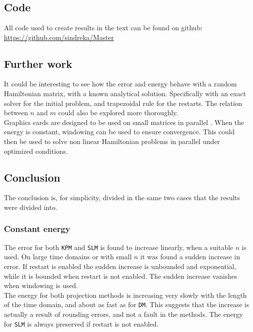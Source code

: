 \chapter{  }
\section{Code}
All code used to create results in the text can be found on github: \\
\url{https://github.com/sindreka/Master}
\section{Further work}
It could be interesting to see how the error and energy behave with a random Hamiltonian matrix, with a known analytical solution. Specifically with an exact solver for the initial problem, and trapezoidal rule for the restarts. The relation between $n$ and $m$ could also be explored more thoroughly. \\

\noindent Graphics cards are designed to be used on small matrices in parallel \cite{graphics}. When the energy is constant, windowing can be used to ensure convergence. This could then be used to solve non linear Hamiltonian problems in parallel under optimized conditions. \\

\section{Conclusion}
The conclusion is, for simplicity, divided in the same two cases that the results were divided into.
\subsection{Constant energy} %
The error for both \texttt{KPM} and \texttt{SLM} is found to increase linearly, when a suitable $n$ is used. On large time domains or with small $n$ it was found a sudden increase in error. If restart is enabled the sudden increase is unbounded and exponential, while it is bounded when restart is not enabled.
The sudden increase vanishes when windowing is used. \\

\noindent The energy for both projection methods is increasing very slowly with the length of the time domain, and about as fast as for \texttt{DM}. This suggests that the increase is actually a result of rounding errors, and not a fault in the methods. The energy for \texttt{SLM} is always preserved if restart is not enabled.\\

